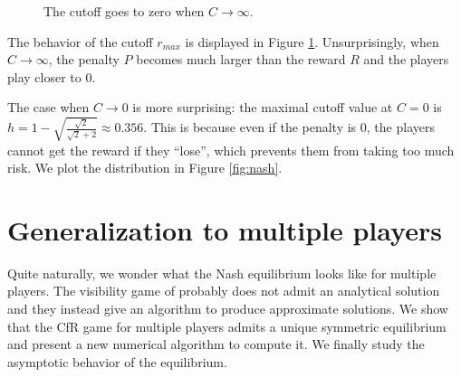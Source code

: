 \documentclass[preprint,12pt,authoryear]{elsarticle}
\theoremstyle{definition}
\begin{document}
\begin{figure}[htbp]
  \centering
  
  \caption{The cutoff goes to zero when $C \rightarrow\infty$.}
  \label{fig:cutoff}  
\end{figure}


 The behavior of the cutoff ${r_{max}}$ is displayed in Figure \ref{fig:cutoff}. Unsurprisingly, when $C \rightarrow \infty$, the penalty $P$ becomes much larger than the reward $R$ and the players play closer to $0$.

The case when $C \rightarrow 0$ is more surprising: the maximal cutoff value at $C=0$ is $h = 1 - \sqrt{\frac{\sqrt{2}}{\sqrt{2} + 2}} \approx 0.356$. This is because even if the penalty is $0$, the players cannot get the reward if they ``lose'', which prevents them from taking too much risk. We plot the distribution in Figure \ref{fig:nash}. 

\section{Generalization to multiple players}

Quite naturally, we wonder what the Nash equilibrium looks like for multiple players. The visibility game of \citet{Lotker2008-tx} probably does not admit an analytical solution and they instead give an algorithm to produce approximate solutions. We show that the CfR game for multiple players admits a unique symmetric equilibrium and present a new numerical algorithm to compute it. We finally study the asymptotic behavior of the equilibrium. 
\end{document}
